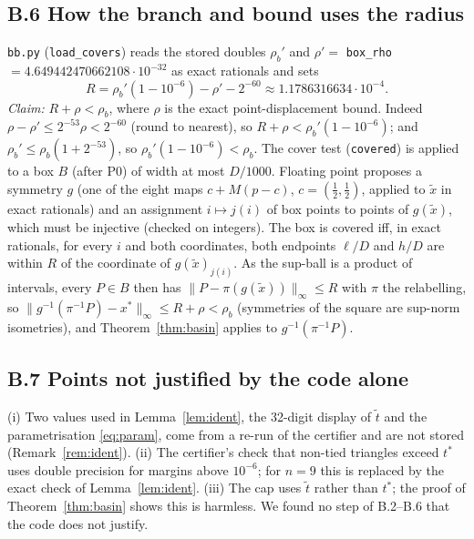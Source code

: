 \documentclass[11pt]{amsart}
\theoremstyle{definition}
\newcommand{\tstar}{t^{*}}
\begin{document}
\subsection*{B.6 How the branch and bound uses the radius}
\texttt{bb.py} (\texttt{load\_covers}) reads the stored doubles $\rho_b'$ and $\rho' = $ \texttt{box\_rho} $= 4.649442470662108\cdot10^{-32}$ as exact rationals and sets
\[
 R = \rho_b'(1 - 10^{-6}) - \rho' - 2^{-60} \approx 1.1786316634\cdot10^{-4}.
\]
\emph{Claim:} $R + \rho < \rho_b$, where $\rho$ is the exact point-displacement bound. Indeed $\rho - \rho' \le 2^{-53}\rho < 2^{-60}$ (round to nearest), so $R + \rho < \rho_b'(1-10^{-6})$; and $\rho_b' \le \rho_b(1 + 2^{-53})$, so $\rho_b'(1 - 10^{-6}) < \rho_b$.
The cover test (\texttt{covered}) is applied to a box $B$ (after P0) of width at most $D/1000$. Floating point proposes a symmetry $g$ (one of the eight maps $c + M(p - c)$, $c = (\frac12,\frac12)$, applied to $\tilde x$ in exact rationals) and an assignment $i \mapsto j(i)$ of box points to points of $g(\tilde x)$, which must be injective (checked on integers). The box is covered iff, in exact rationals, for every $i$ and both coordinates, both endpoints $\ell/D$ and $h/D$ are within $R$ of the coordinate of $g(\tilde x)_{j(i)}$. As the sup-ball is a product of intervals, every $P \in B$ then has $\|P - \pi(g(\tilde x))\|_\infty \le R$ with $\pi$ the relabelling, so $\|g^{-1}(\pi^{-1}P) - x^*\|_\infty \le R + \rho < \rho_b$ (symmetries of the square are sup-norm isometries), and Theorem~\ref{thm:basin} applies to $g^{-1}(\pi^{-1}P)$.

\subsection*{B.7 Points not justified by the code alone}
(i) Two values used in Lemma~\ref{lem:ident}, the 32-digit display of $\tilde t$ and the parametrisation \eqref{eq:param}, come from a re-run of the certifier and are not stored (Remark~\ref{rem:ident}). (ii) The certifier's check that non-tied triangles exceed $\tstar$ uses double precision for margins above $10^{-6}$; for $n = 9$ this is replaced by the exact check of Lemma~\ref{lem:ident}. (iii) The cap uses $\tilde t$ rather than $\tstar$; the proof of Theorem~\ref{thm:basin} shows this is harmless. We found no step of B.2--B.6 that the code does not justify.
\end{document}
